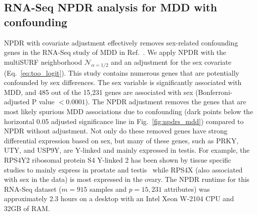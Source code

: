 \documentclass{bioinfo}
\begin{document}
\subsection{RNA-Seq NPDR analysis for MDD with confounding}
NPDR with covariate adjustment effectively removes sex-related confounding genes in the RNA-Seq study of MDD in Ref.~\cite{mostafavi14}.
We apply NPDR with the multiSURF neighborhood $\mathcal{N}_{\alpha=1/2}$ and an adjustment for the sex covariate (Eq.~\ref{eq:too_logit}).
This study contains numerous genes that are potentially confounded by sex differences.
The sex variable is significantly associated with MDD, and 485 out of the 15,231 genes are associated with sex (Bonferroni-adjusted P value $<0.0001$).
The NPDR adjustment removes the genes that are most likely spurious MDD associations due to confounding (dark points below the horizontal 0.05 adjusted significance line in Fig.~\ref{fig:npdrs_mdd}) compared to NPDR without adjustment.
Not only do these removed genes have strong differential expression based on sex, but many of these genes, such as PRKY, UTY, and USP9Y, are Y-linked and mainly expressed in testis.
For example, the RPS4Y2 ribosomal protein S4 Y-linked 2 has been shown by tissue specific studies to mainly express in prostate and testis~\cite{lopes2010human} while RPS4X (also associated with sex in the data) is most expressed in the ovary.
The NPDR runtime for this RNA-Seq dataset ($m=915$ samples and $p=15,231$ attributes) was approximately 2.3 hours on a desktop with an Intel Xeon W-2104 CPU and 32GB of RAM.

\end{document}
